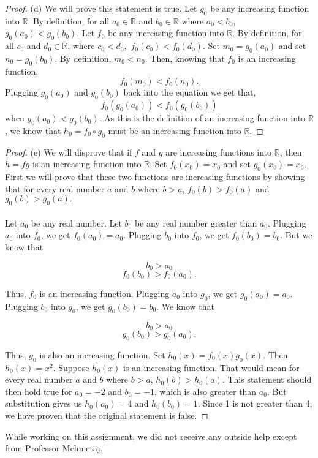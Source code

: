 \documentclass[12pt]{article}
\begin{document}
\begin{proof} (d)
We will prove this statement is true. Let $g_{0}$ be any increasing function into $\mathbb{R}.$ By definition, for all $a_0 \in \mathbb{R}$ and $b_0 \in \mathbb{R}$ where $a_{0} < b_{0},$ $g_{0}(a_{0}) < g_{0}(b_{0}).$ 
Let $f_{0}$ be any increasing function into $\mathbb{R}$. By definition, for all $c_{0}$ and $d_{0} \in \mathbb{R}$, where $c_{0} < d_{0},$ $f_{0}(c_{0}) < f_{0}(d_{0}).$ 
Set $m_{0}= g_{0}(a_{0})$ and set $n_{0} = g_{0}(b_{0}).$ By definition, $m_{0} < n_{0}.$ Then, knowing that $f_{0}$ is an increasing function, $$f_{0}(m_{0}) < f_{0}(n_{0}).$$ Plugging $g_{0}(a_{0})$ and $g_{0}(b_{0})$ back into the equation we get that, $$f_0(g_{0}(a_{0})) < f_0(g_{0}(b_{0}))$$ when $g_{0}(a_{0}) < g_{0}(b_{0}).$ As this is the definition of an increasing function into $\mathbb{R}$, we know that $h_0 = f_{0} \circ g_{0}$ must be an increasing function into $\mathbb{R}.$

\end{proof}
\begin{proof}

(e) We will disprove that if $f$ and $g$ are increasing functions into $\mathbb{R}$, then $h = fg$ is an increasing function into $\mathbb{R}$. Set $f_{0}(x_{0}) = x_{0}$ and set $g_{0}(x_{0}) = x_{0}.$ First we will prove that these two functions are increasing functions by showing that for every real number $a$ and $b$ where $b > a$, $f_0(b) > f_0(a)$ and $g_0(b) > g_0(a).$
\\ \\
Let $a_0$ be any real number. Let $b_0$ be any real number greater than $a_0$. Plugging $a_0$ into $f_0$, we get $f_0(a_0) = a_0$. Plugging $b_0$ into $f_0$, we get $f_0(b_0) = b_0$. But we know that

$$b_0 > a_0$$
$$f_0(b_0) > f_0(a_0).$$

\noindent Thus, $f_0$ is an increasing function. Plugging $a_0$ into $g_0$, we get $g_0(a_0) = a_0$. Plugging $b_0$ into $g_0$, we get $g_0(b_0) = b_0$. We know that

$$b_0 > a_0$$
$$g_0(b_0) > g_0(a_0).$$

\noindent Thus, $g_0$ is also an increasing function. Set $h_0(x) = f_0(x) g_0(x)$. Then $h_0(x) = x^2.$ Suppose $h_0(x)$ is an increasing function. That would mean for every real number $a$ and $b$ where $b > a$, $h_0(b) > h_0(a)$. This statement should then hold true for $a_0 = -2$ and $b_0 = -1$, which is also greater than $a_0$. But substitution gives us $h_0(a_0) = 4$ and $h_0(b_0) = 1$. Since 1 is not greater than 4, we have proven that the original statement is false.

\end{proof}

While working on this assignment, we did not receive any outside help except from Professor Mehmetaj.
\end{document}
